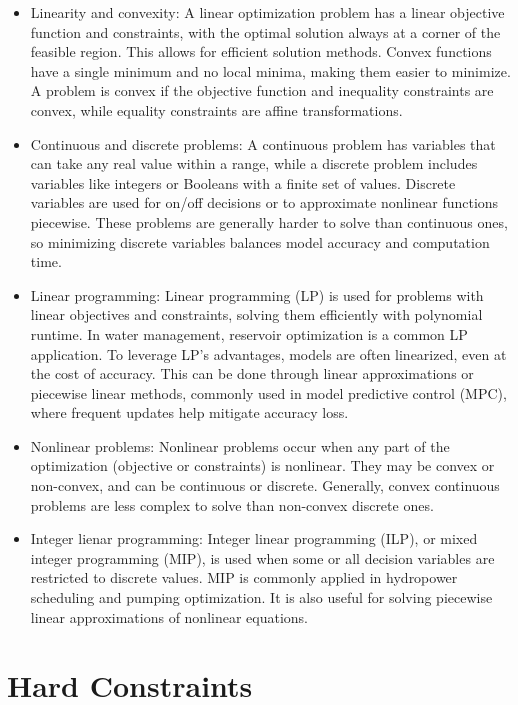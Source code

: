 \begin{itemize}
\item Linearity and convexity: A linear optimization problem has a linear objective function and constraints, with the optimal solution always at a corner of the feasible region. This allows for efficient solution methods. Convex functions have a single minimum and no local minima, making them easier to minimize. A problem is convex if the objective function and inequality constraints are convex, while equality constraints are affine transformations.

\item Continuous and discrete problems: A continuous problem has variables that can take any real value within a range, while a discrete problem includes variables like integers or Booleans with a finite set of values. Discrete variables are used for on/off decisions or to approximate nonlinear functions piecewise. These problems are generally harder to solve than continuous ones, so minimizing discrete variables balances model accuracy and computation time.

\item Linear programming: Linear programming (LP) is used for problems with linear objectives and constraints, solving them efficiently with polynomial runtime. In water management, reservoir optimization is a common LP application. To leverage LP’s advantages, models are often linearized, even at the cost of accuracy. This can be done through linear approximations or piecewise linear methods, commonly used in model predictive control (MPC), where frequent updates help mitigate accuracy loss.

\item Nonlinear problems: Nonlinear problems occur when any part of the optimization (objective or constraints) is nonlinear. They may be convex or non-convex, and can be continuous or discrete. Generally, convex continuous problems are less complex to solve than non-convex discrete ones.

\item Integer lienar programming: Integer linear programming (ILP), or mixed integer programming (MIP), is used when some or all decision variables are restricted to discrete values. MIP is commonly applied in hydropower scheduling and pumping optimization. It is also useful for solving piecewise linear approximations of nonlinear equations.
\end{itemize}


\section{Hard Constraints}


